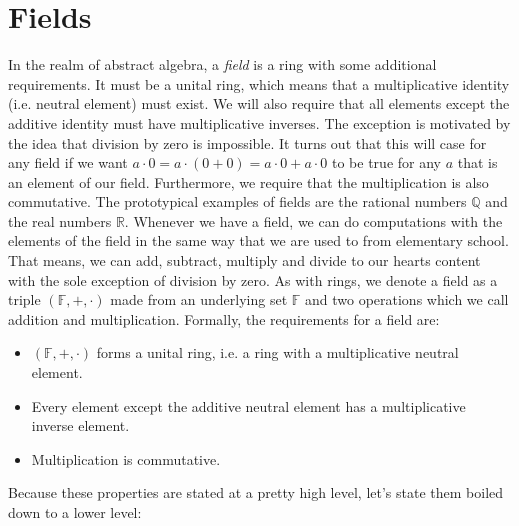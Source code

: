 \section{Fields}
In the realm of abstract algebra, a \emph{field} is a ring with some additional requirements. It must be a unital ring, which means that a multiplicative identity (i.e. neutral element) must exist. We will also require that all elements except the additive identity must have multiplicative inverses. The exception is motivated by the idea that division by zero is impossible. It turns out that this will case for any field if we want $a \cdot 0 = a \cdot (0 + 0) = a \cdot 0 + a \cdot 0$ to be true for any $a$ that is an element of our field. Furthermore, we require that the multiplication is also commutative. The prototypical examples of fields are the rational numbers $\mathbb{Q}$ and the real numbers $\mathbb{R}$. Whenever we have a field, we can do computations with the elements of the field in the same way that we are used to from elementary school. That means, we can add, subtract, multiply and divide to our hearts content with the sole exception of division by zero. As with rings, we denote a field as a triple $(\mathbb{F}, +, \cdot)$ made from an underlying set $\mathbb{F}$ and two operations which we call addition and multiplication. Formally, the requirements for a field are:
\begin{itemize}
\item $(\mathbb{F},+,\cdot)$ forms a unital ring, i.e. a ring with a multiplicative neutral element.
\item Every element except the additive neutral element has a multiplicative inverse element.
\item Multiplication is commutative.
\end{itemize}
Because these properties are stated at a pretty high level, let's state them boiled down to a lower level:

